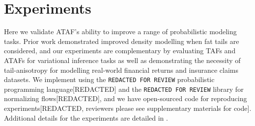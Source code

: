 \documentclass[twoside]{article}
\theoremstyle{definition}
\theoremstyle{remark}
\begin{document}




\vspace{-2mm}
\section{Experiments}
\label{sec:experiments}

\vspace{-1mm}
Here we validate ATAF's ability to improve
a range of probabilistic modeling tasks.
Prior work \citep{jaini2020tails} demonstrated improved
density modelling when fat tails are considered, and
our experiments are complementary by evaluating TAFs and ATAFs for variational inference tasks as well as demonstrating the necessity of tail-anisotropy for modelling real-world financial returns and insurance claims datasets.
We implement using the 
\texttt{REDACTED FOR REVIEW} probabilistic programming language[REDACTED]
and the
\texttt{REDACTED FOR REVIEW} library for normalizing flows[REDACTED],
and we have open-sourced code for reproducing experiments[REDACTED, reviewers please see supplementary materials for code]. 
Additional details for the experiments are detailed in .
\end{document}
